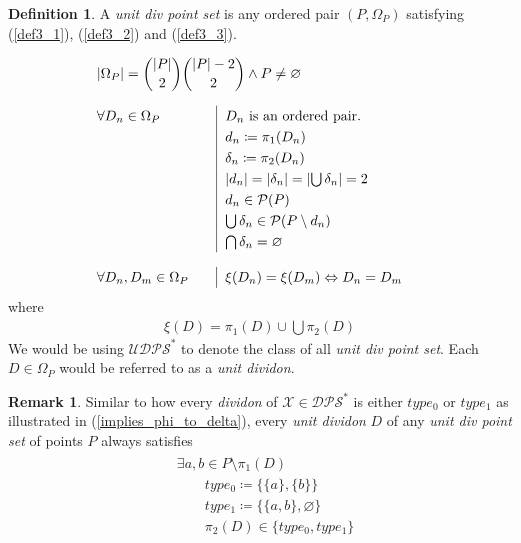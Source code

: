 \documentclass[11pt, oneside]{article}      %
\theoremstyle{definition}
\newtheorem{defn}{Definition}
\numberwithin{equation}{section}
\newtheorem*{remark}{Remark}
\newcommand{\reff}[1]{(\ref{#1})}
\theoremstyle{c}
\begin{document}
\begin{defn}
A \textit{unit div point set} is any ordered pair $(P,\Omega_P)$ satisfying \reff{def3_1}, \reff{def3_2} and \reff{def3_3}.

\begin{alignat}{2}\label{def3_1}
  &\mathrlap{\lvert\Omega_P\rvert = \binom{\lvert P\rvert}{2}  \binom{|P|-2}{2} \land P \not= \varnothing}\\[1.5ex] \label{def3_2}
    & \forall D_n \in \Omega_P & \quad & \begin{aligned}[t] \renewcommand\arraystretch{1.25}\begin{array}[t]{|@{\hskip0.6em}l}
    D_n \text{ is an ordered pair. } \\
  d_n \coloneqq \pi_1(D_n) \\
  \delta_n \coloneqq \pi_2(D_n) \\
    \lvert d_n\rvert = \lvert\delta_n\rvert = \lvert\bigcup \delta_n\rvert =2\\
  d_n \in \mathcal{P}(P)\\
  \bigcup \delta_n \in \mathcal{P}(P \setminus d_n) \\
  \bigcap \delta_n = \varnothing
  \end{array}
  \end{aligned}\\[1.5ex] \label{def3_3}
    & \forall D_n, D_m \in \Omega_P & \quad & \begin{aligned}[t] \renewcommand\arraystretch{1.25}\begin{array}[t]{|@{\hskip0.6em}l}
   \xi(D_n) = \xi(D_m)  \Leftrightarrow D_n=D_m
  \end{array}
  \end{aligned}
\end{alignat}
where
\begin{align}
\xi(D) = \pi_1(D) \cup \bigcup \pi_2(D)
\end{align}
We would be using $\mathscr{UDPS}^*$ to denote the class of all \textit{unit div point set}. Each $D \in \Omega_P$ would be referred to as a \textit{unit dividon}.
\end{defn}
\begin{remark}
Similar to how every \textit{dividon} of $\mathscr{X} \in \mathscr{DPS^*}$ is either $type_0$ or $type_1$ as illustrated in \reff{implies_phi_to_delta}, every \textit{unit dividon} $D$ of any \textit{unit div point set} of points $P$ always satisfies
\begin{gather}
\begin{split}  \label{implies_phi_to_delta2}
& \exists a,b \in P \setminus \pi_1(D) \\
&  \qquad type_0 \coloneqq \{\{a\},\{b\}\}\\
& \qquad type_1 \coloneqq \{\{a,b\},\varnothing\} \\
& \qquad \pi_2(D) \in \{ type_0, type_1 \} \\
 \end{split}
\end{gather}
\end{remark}
\end{document}
